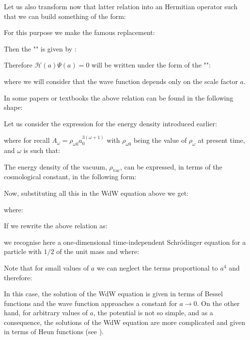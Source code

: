 	Let us also transform now that latter relation into an Hermitian operator such that we can build something of the form:
	
	For this purpose we make the famous replacement:
	
	Then the "" is given by :
	
	Therefore $\mathcal{H}(a)\Psi(a)=0$ will be written under the form of the "":
	
	where we will consider that the wave function depends only on the scale factor $a$.
	
	\begin{tcolorbox}[title=Remark,colframe=black,arc=10pt]
	In some papers or textbooks the above relation can be found in the following shape:
	
	Let us consider the expression for the energy density introduced earlier:
	
	where for recall $A_{\omega}=\rho_{\omega 0} a_{0}^{3(\omega+1)}$ with $\rho_{\omega 0}$ being the value of $\rho_{\omega}$ at present time, and $\omega$ is such that:
	
	The energy density of the vacuum, $\rho_{\text{vac}}$, can be expressed, in terms of the cosmological constant, in the following form:
	
	Now, substituting all this in the WdW equation above we get:
	
	where:
	
	\end{tcolorbox}
	
	If we rewrite the above relation as:
	
	we recognise here a one-dimensional time-independent Schrödinger equation for a particle with $1/2$ of the unit mass and where:
	
	Note that for small values of $a$ we can neglect the terms proportional to $a^4$ and therefore:
	
	In this case, the solution of the WdW equation is given in terms of Bessel functions and the wave function approaches a constant for $a\rightarrow 0$. On the other hand, for arbitrary values of $a$, the potential is not so simple, and as a consequence, the solutions of the WdW equation are more complicated and given in terms of Heun functions (see \cite{ronveaux1995heun}).
	

